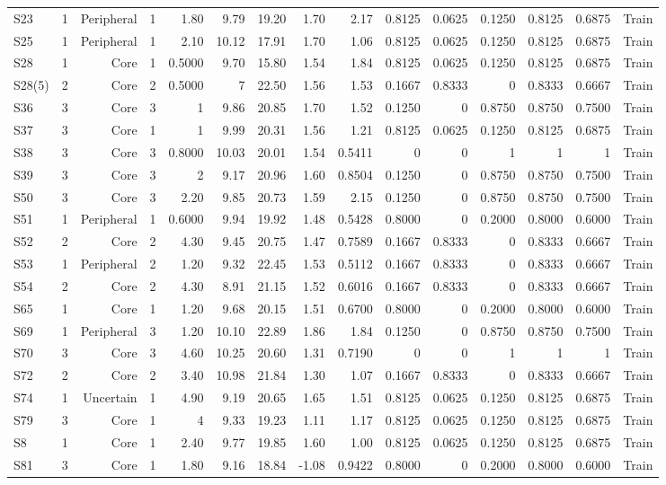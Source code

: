 {\begin{longtable}{lrrrrrrrrrrrrrr}
  S23 & 1 & Peripheral & 1 & 1.80 & 9.79 & 19.20 & 1.70 & 2.17 & 0.8125 & 0.0625 & 0.1250 & 0.8125 & 0.6875 & Train \\
  S25 & 1 & Peripheral & 1 & 2.10 & 10.12 & 17.91 & 1.70 & 1.06 & 0.8125 & 0.0625 & 0.1250 & 0.8125 & 0.6875 & Train \\
  S28 & 1 & Core & 1 & 0.5000 & 9.70 & 15.80 & 1.54 & 1.84 & 0.8125 & 0.0625 & 0.1250 & 0.8125 & 0.6875 & Train \\
  S28(5) & 2 & Core & 2 & 0.5000 & 7 & 22.50 & 1.56 & 1.53 & 0.1667 & 0.8333 & 0 & 0.8333 & 0.6667 & Train \\
  S36 & 3 & Core & 3 & 1 & 9.86 & 20.85 & 1.70 & 1.52 & 0.1250 & 0 & 0.8750 & 0.8750 & 0.7500 & Train \\
  S37 & 3 & Core & 1 & 1 & 9.99 & 20.31 & 1.56 & 1.21 & 0.8125 & 0.0625 & 0.1250 & 0.8125 & 0.6875 & Train \\
  S38 & 3 & Core & 3 & 0.8000 & 10.03 & 20.01 & 1.54 & 0.5411 & 0 & 0 & 1 & 1 & 1 & Train \\
  S39 & 3 & Core & 3 & 2 & 9.17 & 20.96 & 1.60 & 0.8504 & 0.1250 & 0 & 0.8750 & 0.8750 & 0.7500 & Train \\
  S50 & 3 & Core & 3 & 2.20 & 9.85 & 20.73 & 1.59 & 2.15 & 0.1250 & 0 & 0.8750 & 0.8750 & 0.7500 & Train \\
  S51 & 1 & Peripheral & 1 & 0.6000 & 9.94 & 19.92 & 1.48 & 0.5428 & 0.8000 & 0 & 0.2000 & 0.8000 & 0.6000 & Train \\
  S52 & 2 & Core & 2 & 4.30 & 9.45 & 20.75 & 1.47 & 0.7589 & 0.1667 & 0.8333 & 0 & 0.8333 & 0.6667 & Train \\
  S53 & 1 & Peripheral & 2 & 1.20 & 9.32 & 22.45 & 1.53 & 0.5112 & 0.1667 & 0.8333 & 0 & 0.8333 & 0.6667 & Train \\
  S54 & 2 & Core & 2 & 4.30 & 8.91 & 21.15 & 1.52 & 0.6016 & 0.1667 & 0.8333 & 0 & 0.8333 & 0.6667 & Train \\
  S65 & 1 & Core & 1 & 1.20 & 9.68 & 20.15 & 1.51 & 0.6700 & 0.8000 & 0 & 0.2000 & 0.8000 & 0.6000 & Train \\
  S69 & 1 & Peripheral & 3 & 1.20 & 10.10 & 22.89 & 1.86 & 1.84 & 0.1250 & 0 & 0.8750 & 0.8750 & 0.7500 & Train \\
  S70 & 3 & Core & 3 & 4.60 & 10.25 & 20.60 & 1.31 & 0.7190 & 0 & 0 & 1 & 1 & 1 & Train \\
  S72 & 2 & Core & 2 & 3.40 & 10.98 & 21.84 & 1.30 & 1.07 & 0.1667 & 0.8333 & 0 & 0.8333 & 0.6667 & Train \\
  S74 & 1 & Uncertain & 1 & 4.90 & 9.19 & 20.65 & 1.65 & 1.51 & 0.8125 & 0.0625 & 0.1250 & 0.8125 & 0.6875 & Train \\
  S79 & 3 & Core & 1 & 4 & 9.33 & 19.23 & 1.11 & 1.17 & 0.8125 & 0.0625 & 0.1250 & 0.8125 & 0.6875 & Train \\
  S8 & 1 & Core & 1 & 2.40 & 9.77 & 19.85 & 1.60 & 1.00 & 0.8125 & 0.0625 & 0.1250 & 0.8125 & 0.6875 & Train \\
  S81 & 3 & Core & 1 & 1.80 & 9.16 & 18.84 & -1.08 & 0.9422 & 0.8000 & 0 & 0.2000 & 0.8000 & 0.6000 & Train \\
\end{longtable}
}
